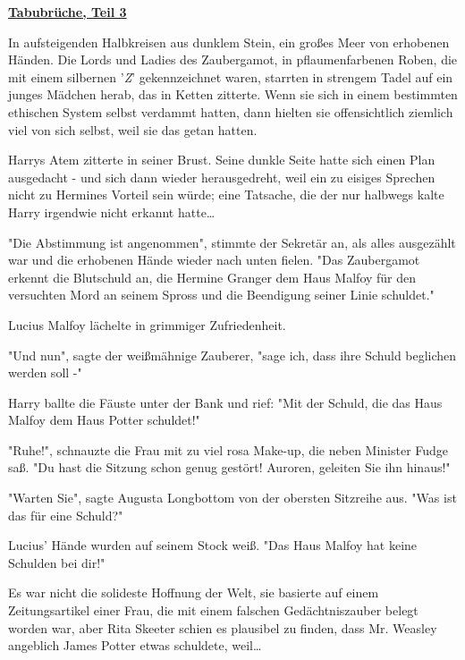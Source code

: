 

\hypertarget{tabubruxfcche-teil-3}{%

\textbf{\uline{Tabubrüche, Teil 3}}

In aufsteigenden Halbkreisen aus dunklem Stein, ein großes Meer von erhobenen Händen. Die Lords und Ladies des Zaubergamot, in pflaumenfarbenen Roben, die mit einem silbernen '\emph{Z}' gekennzeichnet waren, starrten in strengem Tadel auf ein junges Mädchen herab, das in Ketten zitterte. Wenn sie sich in einem bestimmten ethischen System selbst verdammt hatten, dann hielten sie offensichtlich ziemlich viel von sich selbst, weil sie das getan hatten.

Harrys Atem zitterte in seiner Brust. Seine dunkle Seite hatte sich einen Plan ausgedacht - und sich dann wieder herausgedreht, weil ein zu eisiges Sprechen nicht zu Hermines Vorteil sein würde; eine Tatsache, die der nur halbwegs kalte Harry irgendwie nicht erkannt hatte…

"Die Abstimmung ist angenommen", stimmte der Sekretär an, als alles ausgezählt war und die erhobenen Hände wieder nach unten fielen. "Das Zaubergamot erkennt die Blutschuld an, die Hermine Granger dem Haus Malfoy für den versuchten Mord an seinem Spross und die Beendigung seiner Linie schuldet."

Lucius Malfoy lächelte in grimmiger Zufriedenheit.

"Und nun", sagte der weißmähnige Zauberer, "sage ich, dass ihre Schuld beglichen werden soll -"

Harry ballte die Fäuste unter der Bank und rief: "Mit der Schuld, die das Haus Malfoy dem Haus Potter schuldet!"

"Ruhe!", schnauzte die Frau mit zu viel rosa Make-up, die neben Minister Fudge saß. "Du hast die Sitzung schon genug gestört! Auroren, geleiten Sie ihn hinaus!"

"Warten Sie", sagte Augusta Longbottom von der obersten Sitzreihe aus. "Was ist das für eine Schuld?"

Lucius' Hände wurden auf seinem Stock weiß. "Das Haus Malfoy hat keine Schulden bei dir!"

Es war nicht die solideste Hoffnung der Welt, sie basierte auf einem Zeitungsartikel einer Frau, die mit einem falschen Gedächtniszauber belegt worden war, aber Rita Skeeter schien es plausibel zu finden, dass Mr. Weasley angeblich James Potter etwas schuldete, weil…

}
